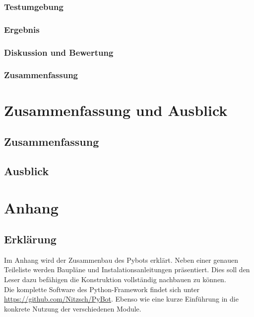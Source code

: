 \documentclass[a4paper,cleardoubleempty,BCOR1cm]{book}
\begin{document}
\subsection{Testumgebung}

\subsection{Ergebnis}

\subsection{Diskussion und Bewertung}


\subsection{Zusammenfassung}




\chapter{Zusammenfassung und Ausblick}

\section{Zusammenfassung}

\section{Ausblick}



%

\appendix
\chapter{Anhang}
\section{Erklärung}
Im Anhang wird der Zusammenbau des Pybots erklärt. Neben einer genauen Teileliste werden Baupläne und Instalationsanleitungen präsentiert. Dies soll den Leser dazu befähigen die Konstruktion vollständig nachbauen zu können. \\
Die komplette Software des Python-Framework findet sich unter \url{https://github.com/Nitzsch/PyBot}. Ebenso wie eine kurze Einführung in die konkrete Nutzung der verschiedenen Module. 
\end{document}

